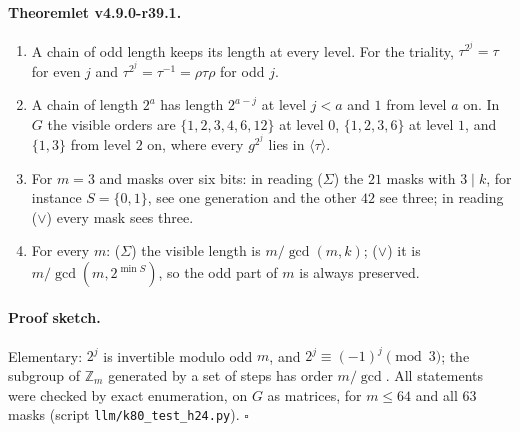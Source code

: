 \paragraph{Theoremlet v4.9.0-r39.1.}
\begin{enumerate}[leftmargin=2em]
\item[(a)] A chain of odd length keeps its length at every level.  For the triality, \(\tau^{2^j}=\tau\) for even \(j\) and
\(\tau^{2^j}=\tau^{-1}=\rho\tau\rho\) for odd \(j\).
\item[(b)] A chain of length \(2^a\) has length \(2^{a-j}\) at level \(j<a\) and \(1\) from level \(a\) on.  In \(G\) the visible orders are
\(\{1,2,3,4,6,12\}\) at level \(0\), \(\{1,2,3,6\}\) at level \(1\), and \(\{1,3\}\) from level \(2\) on, where every \(g^{2^j}\) lies in
\(\langle\tau\rangle\).
\item[(c)] For \(m=3\) and masks over six bits: in reading (\(\Sigma\)) the \(21\) masks with \(3\mid k\), for instance \(S=\{0,1\}\), see one
generation and the other \(42\) see three; in reading (\(\vee\)) every mask sees three.
\item[(d)] For every \(m\): (\(\Sigma\)) the visible length is \(m/\gcd(m,k)\); (\(\vee\)) it is \(m/\gcd(m,2^{\min S})\), so the odd part of \(m\)
is always preserved.
\end{enumerate}

\paragraph{Proof sketch.}
Elementary: \(2^j\) is invertible modulo odd \(m\), and \(2^j\equiv(-1)^j\pmod 3\); the subgroup of \(\mathbb Z_m\) generated by a set of
steps has order \(m/\gcd\).  All statements were checked by exact enumeration, on \(G\) as matrices, for \(m\le64\) and all \(63\) masks
(script \texttt{llm/k80\_test\_h24.py}).  \(\square\)

